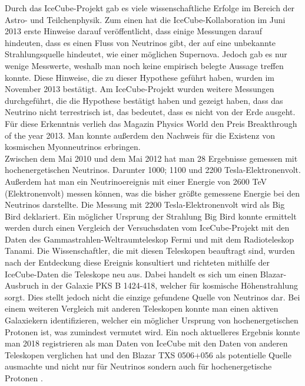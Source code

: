    Durch das IceCube-Projekt gab es viele wissenschaftliche Erfolge im Bereich der 
    Astro- und Teilchenphysik. Zum einen hat die IceCube-Kollaboration im Juni 2013 
    erste Hinweise darauf veröffentlicht, dass einige Messungen darauf hindeuten, dass es einen
    Fluss von Neutrinos gibt, der auf eine unbekannte Strahlungsquelle hindeutet, wie einer möglichen 
    Supernova. Jedoch gab es nur wenige Messwerte, weshalb man noch keine empirisch belegte Aussage treffen konnte. 
    Diese Hinweise, die zu dieser Hypothese geführt haben, wurden im November 2013 bestätigt. 
    Am IceCube-Projekt wurden weitere Messungen durchgeführt, die die Hypothese bestätigt 
    haben und gezeigt haben, dass das Neutrino nicht terrestrisch ist, das bedeutet, dass es
    nicht von der Erde ausgeht. Für diese Erkenntnis verlieh das Magazin \grqq Physics World\grqq{}
    den Preis \grqq Breakthrough of the year 2013\grqq{}. Man konnte außerdem den Nachweis
    für die Existenz von kosmischen Myonneutrinos erbringen.\\
    Zwischen dem Mai 2010 und dem Mai 2012 hat man 28 Ergebnisse gemessen mit 
    hochenergetischen Neutrinos. Darunter 1000; 1100 und 2200 Tesla-Elektronenvolt. 
    Außerdem hat man ein Neutrinoereignis mit einer Energie von 2600 TeV (Elektronenvolt) 
    messen können, was die bisher größte gemessene Energie bei den Neutrinos darstellte. 
    Die Messung mit 2200 Tesla-Elektronenvolt wird als Big Bird deklariert. Ein möglicher Ursprung 
    der Strahlung Big Bird konnte ermittelt werden durch einen Vergleich der Versuchsdaten vom 
    IceCube-Projekt mit den Daten des Gammastrahlen-Weltraumteleskop Fermi und mit dem 
    Radioteleskop Tanami. Die Wissenschaftler, die mit diesen Teleskopen beauftragt sind, 
    wurden nach der Entdeckung diese Ereignis konsultiert und richteten mithilfe der 
    IceCube-Daten die Teleskope neu aus. Dabei handelt es sich um einen Blazar-Ausbruch in 
    der Galaxie PKS B 1424-418, welcher für kosmische Höhenstrahlung sorgt. Dies stellt 
    jedoch nicht die einzige gefundene Quelle von Neutrinos dar. Bei einem weiteren Vergleich 
    mit anderen Teleskopen konnte man einen aktiven Galaxiekern identifizieren, welcher ein 
    möglicher Ursprung von hochenergetischen Protonen ist, was zumindest vermutet wird. Ein 
    noch aktuelleres Ergebnis konnte man 2018 registrieren als man Daten von IceCube mit den 
    Daten von anderen Teleskopen verglichen hat und den Blazar TXS 0506+056 als potentielle 
    Quelle ausmachte und nicht nur für Neutrinos sondern auch für hochenergetische Protonen \cite{FAQ13} \cite{DeFuInt18}.
    

